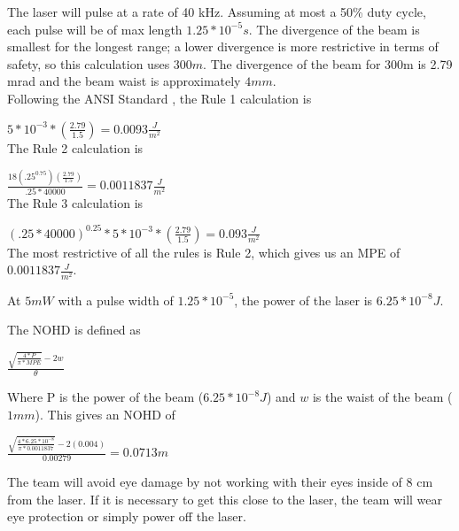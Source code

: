 \documentclass[letterpaper,10pt]{article}
\begin{document}
\begin{spacing}{1.15}
The laser will pulse at a rate of 40 kHz. Assuming at most a 50\% duty cycle, each pulse will be of max length $1.25*10^{-5} s$. The divergence of the beam is smallest for the longest range; a lower divergence is more restrictive in terms of safety, so this calculation uses $300m$. The divergence of the beam for 300m is 2.79 mrad and the beam waist is approximately $4 mm$. \\

Following the ANSI Standard \cite{ANSI}, the Rule 1 calculation is 

{\large $5*10^{-3}*(\frac{2.79}{1.5})  = 0.0093 \frac{J}{m^2}$ }\\

The Rule 2 calculation is

{\large $\frac{18(.25^{0.75})(\frac{2.79}{1.5})}{.25*40000} = 0.0011837 \frac{J}{m^2}$ }\\

The Rule 3 calculation is

{\large $(.25*40000)^{0.25} * 5*10^{-3}*(\frac{2.79}{1.5}) = 0.093 \frac{J}{m^2}$ }\\

The most restrictive of all the rules is Rule 2, which gives us an MPE of $0.0011837 \frac{J}{m^2}$.

At $5mW$ with a pulse width of $1.25*10^{-5}$, the power of the laser is $6.25*10^{-8} J$. 

The NOHD is defined as

{\LARGE $ \frac{\sqrt{\frac{4 * P}{\pi * MPE}} - 2w}{\theta}$}

Where P is the power of the beam ($6.25*10^{-8} J$) and $w$ is the waist of the beam ($1mm$). This gives an NOHD of 

{\Large$ \frac{\sqrt{\frac{4 * 6.25*10^{-8}}{\pi * 0.0011837}} - 2(0.004)}{0.00279} = 0.0713 m $}
	
The team will avoid eye damage by not working with their eyes inside of 8 cm from the laser. If it is necessary to get this close to the laser, the team will wear eye protection or simply power off the laser. 

\clearpage



\clearpage
\end{spacing}
\end{document}
